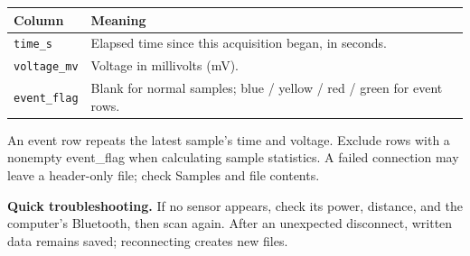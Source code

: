 \documentclass[a4paper,10pt]{article}
\newcommand{\note}[1]{{\small\color{muted}#1}}
\begin{document}
\begin{tabularx}{\linewidth}{@{}lX@{}}\toprule
\textbf{Column} & \textbf{Meaning}\\\midrule
\texttt{time\_s} & Elapsed time since this acquisition began, in seconds.\\
\texttt{voltage\_mv} & Voltage in millivolts (mV).\\
\texttt{event\_flag} & Blank for normal samples; blue / yellow / red / green for event rows.\\\bottomrule
\end{tabularx}
\note{An event row repeats the latest sample's time and voltage. Exclude rows with a nonempty event\_flag when calculating sample statistics. A failed connection may leave a header-only file; check Samples and file contents.}

\vspace{3pt}\textbf{Quick troubleshooting.} \small If no sensor appears, check its power, distance, and the computer's Bluetooth, then scan again. After an unexpected disconnect, written data remains saved; reconnecting creates new files.
\end{document}
